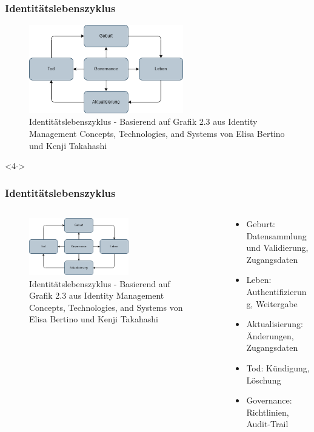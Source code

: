 \documentclass[11pt]{beamer}
\begin{document}
\begin{frame}
  \frametitle{Identitätslebenszyklus}
  \begin{figure}[H]
    \centering
    \includegraphics[width=0.6\textwidth]{assets/idlc.png}
    \caption{Identitätslebenszyklus - Basierend auf Grafik 2.3 aus \glqq{}Identity Management Concepts, Technologies, and Systems\grqq{} von Elisa Bertino und Kenji Takahashi}\label{fig:idlc}
  \end{figure}
\end{frame}

\begin{frame}<4->
  \frametitle{Identitätslebenszyklus}
  \begin{columns}
    \begin{column}{0.7\textwidth}
      \begin{figure}[H]
        \centering
        \includegraphics[width=0.6\textwidth]{assets/idlc.png}
        \caption{Identitätslebenszyklus - Basierend auf Grafik 2.3 aus \glqq{}Identity Management Concepts, Technologies, and Systems\grqq{} von Elisa Bertino und Kenji Takahashi}\label{fig:idlc}
      \end{figure}
    \end{column}
    \begin{column}{0.3\textwidth}
      \begin{itemize}
        \item Geburt: Datensammlung und Validierung, Zugangsdaten
        \item Leben: Authentifizierung, Weitergabe
        \item Aktualisierung: Änderungen, Zugangsdaten
        \item Tod: Kündigung, Löschung
        \item Governance: Richtlinien, Audit-Trail~
      \end{itemize}

    \end{column}
  \end{columns}
\end{frame}
\end{document}

